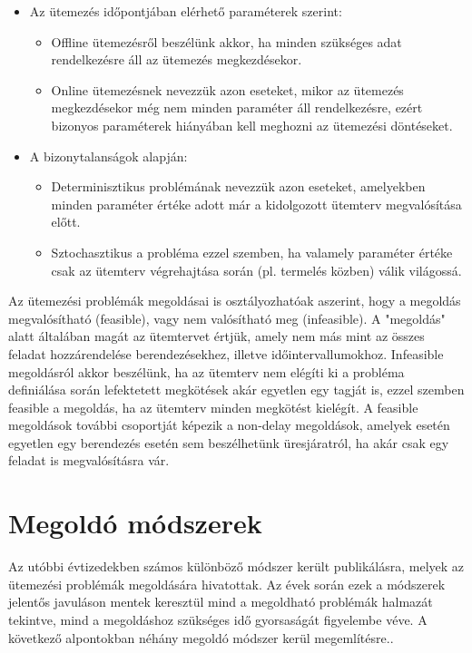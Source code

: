 \begin{itemize}
\item Az ütemezés időpontjában elérhető paraméterek szerint:
\begin{itemize}
\item Offline ütemezésről beszélünk akkor, ha minden szükséges adat rendelkezésre áll az ütemezés megkezdésekor.
\item Online ütemezésnek nevezzük azon eseteket, mikor az ütemezés megkezdésekor még nem minden paraméter áll rendelkezésre, ezért bizonyos paraméterek hiányában kell meghozni az ütemezési döntéseket.
\end{itemize} 
\item A bizonytalanságok alapján:
\begin{itemize}
\item Determinisztikus problémának nevezzük azon eseteket, amelyekben minden paraméter értéke adott már a kidolgozott ütemterv megvalósítása előtt.
\item Sztochasztikus a probléma ezzel szemben, ha valamely paraméter értéke csak az ütemterv végrehajtása során (pl. termelés közben) válik világossá.
\end{itemize}
\end{itemize}
Az ütemezési problémák megoldásai is osztályozhatóak aszerint, hogy a megoldás megvalósítható (feasible), vagy nem valósítható meg (infeasible).
A "megoldás" alatt általában magát az ütemtervet értjük, amely nem más mint az összes feladat hozzárendelése berendezésekhez, illetve időintervallumokhoz.
Infeasible megoldásról akkor beszélünk, ha az ütemterv nem elégíti ki a probléma definiálása során lefektetett megkötések akár egyetlen egy tagját is, ezzel szemben feasible a megoldás, ha az ütemterv minden megkötést kielégít.
A feasible megoldások további csoportját képezik a non-delay megoldások, amelyek esetén egyetlen egy berendezés esetén sem beszélhetünk üresjáratról, ha akár csak egy feladat is megvalósításra vár.     
\section{Megoldó módszerek}
Az utóbbi évtizedekben számos különböző módszer került publikálásra, melyek az ütemezési problémák megoldására hivatottak.
Az évek során ezek a módszerek jelentős javuláson mentek keresztül mind a megoldható problémák halmazát tekintve, mind a megoldáshoz szükséges idő gyorsaságát figyelembe véve.
A következő alpontokban néhány megoldó módszer kerül megemlítésre..
